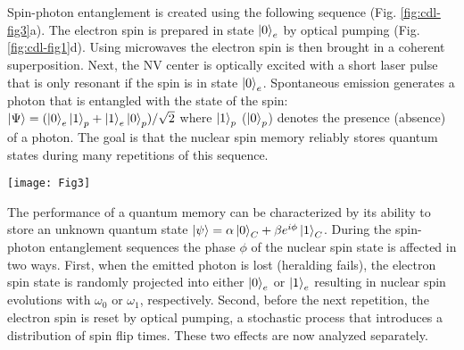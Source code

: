 Spin-photon entanglement is created using the following sequence (Fig. \ref{fig:cdl-fig3}a). The electron spin is prepared in state $\left|0\right>_e$ by optical pumping (Fig. \ref{fig:cdl-fig1}d). Using microwaves the electron spin is then brought in a coherent superposition. Next, the NV center is optically excited with a short laser pulse that is only resonant if the spin is in state $\left|0\right>_e$. Spontaneous emission generates a photon that is entangled with the state of the spin: $\left|\Psi\right> = (\left|0\right>_e \left|1\right>_p +\left|1\right>_e \left|0\right>_p)/\sqrt{2}$  where $\left|1\right>_p$ ($\left|0\right>_p$)  denotes the presence (absence) of a photon. The goal is that the nuclear spin memory reliably stores quantum states during many repetitions of this sequence.

 \begin{figure*}
	\centering
	\texttt{[image: Fig3]}
	\caption{\label{fig:cdl-fig3} \textbf{Simulations of the dephasing of a $^{13}$C spin quantum memory while generating entanglement. } (a) Diagram for the protocol to create spin-photon entanglement. (b) Simulations of the fidelity for different $^{13}$C spins after \textit{N} = 50 repetitions of the protocol, assuming that the reset is instantaneous ($t^{\prime}$ = 0, formula \ref{eq:CDL-deph} of main text). The initial state of a carbon spin can be perfectly preserved by choosing the time between the $\pi$/2-pulse and the reset to \textit{t} = 2$\pi$ /$d \omega$. (c) The effect of the spin pumping process on the fidelity of the memory after \textit{N} = 50 repetitions. Orange dots are a Monte-Carlo simulation where for every electron spin reset, a time $t^{\prime}$ is drawn from an exponential probability distribution with $\tau_{reset}$ = 390 ns. Grey line is a comparison with an ideal reset. $d \omega$ = (2$\pi$) 38.6 kHz. (d) Dependence of the memory fidelity on the characteristic reset time $\tau_{reset}$ using formula \ref{eq:CDL-deph_an}. (e) Dephasing of the memory as a function of entanglement attempts for different coupling strengths, fixing  $\tau_{reset}$ = 1 $\mu$s.}
\end{figure*}



The performance of a quantum memory can be characterized by its ability to store an unknown quantum state $\left|\psi\right> = \alpha \left|0\right>_C + \beta e^{i \phi}\left|1\right>_C$. During the spin-photon entanglement sequences the phase $\phi$ of the nuclear spin state is affected in two ways. First, when the emitted photon is lost (heralding fails), the electron spin state is randomly projected into either $\left|0\right>_e$ or $\left|1\right>_e$ resulting in nuclear spin evolutions with $\omega_0$ or $\omega_1$, respectively. Second, before the next repetition, the electron spin is reset by optical pumping, a stochastic process that introduces a distribution of spin flip times. These two effects are now analyzed separately.

